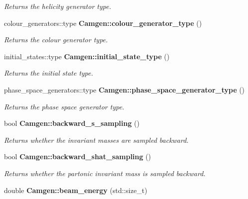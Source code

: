 \begin{DoxyCompactItemize}
\begin{DoxyCompactList}\small\item\em Returns the helicity generator type. \end{DoxyCompactList}\item 
\hypertarget{a00878_aadb35b3258ed02ac23e9bceb092cf617}{}colour\+\_\+generators\+::type {\bfseries Camgen\+::colour\+\_\+generator\+\_\+type} ()\label{a00878_aadb35b3258ed02ac23e9bceb092cf617}

\begin{DoxyCompactList}\small\item\em Returns the colour generator type. \end{DoxyCompactList}\item 
\hypertarget{a00878_a0691af5b6af1f99a786fe45da43dd80b}{}initial\+\_\+states\+::type {\bfseries Camgen\+::initial\+\_\+state\+\_\+type} ()\label{a00878_a0691af5b6af1f99a786fe45da43dd80b}

\begin{DoxyCompactList}\small\item\em Returns the initial state type. \end{DoxyCompactList}\item 
\hypertarget{a00878_add0039ba62eccad4ce500a7d14205ce0}{}phase\+\_\+space\+\_\+generators\+::type {\bfseries Camgen\+::phase\+\_\+space\+\_\+generator\+\_\+type} ()\label{a00878_add0039ba62eccad4ce500a7d14205ce0}

\begin{DoxyCompactList}\small\item\em Returns the phase space generator type. \end{DoxyCompactList}\item 
\hypertarget{a00878_a2f56b600196d9e593d244563d9699ea7}{}bool {\bfseries Camgen\+::backward\+\_\+s\+\_\+sampling} ()\label{a00878_a2f56b600196d9e593d244563d9699ea7}

\begin{DoxyCompactList}\small\item\em Returns whether the invariant masses are sampled backward. \end{DoxyCompactList}\item 
\hypertarget{a00878_a597636ede67b7edd2a7802d8619303cd}{}bool {\bfseries Camgen\+::backward\+\_\+shat\+\_\+sampling} ()\label{a00878_a597636ede67b7edd2a7802d8619303cd}

\begin{DoxyCompactList}\small\item\em Returns whether the partonic invariant mass is sampled backward. \end{DoxyCompactList}\item 
\hypertarget{a00878_ad1362c10614d6c2848d4c93a443474bc}{}double {\bfseries Camgen\+::beam\+\_\+energy} (std\+::size\+\_\+t)\label{a00878_ad1362c10614d6c2848d4c93a443474bc}


\end{DoxyCompactItemize}
